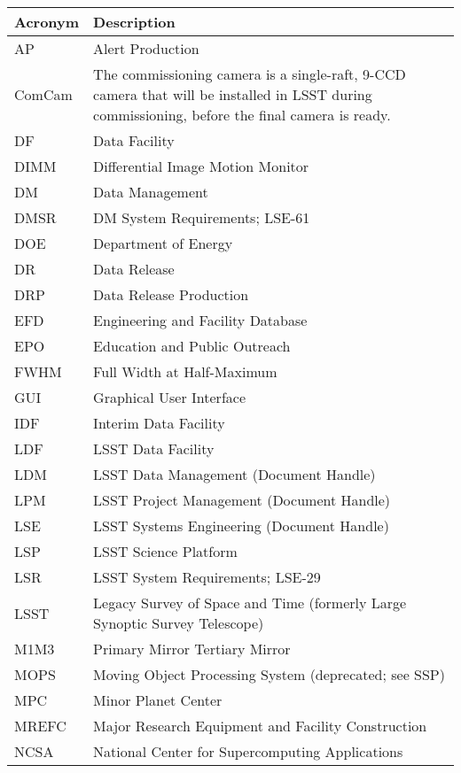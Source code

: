 \addtocounter{table}{-1}
\begin{longtable}{p{}p{}}\hline
\textbf{Acronym} & \textbf{Description}  \\\hline

AP & Alert Production \\\hline
ComCam & The commissioning camera is a single-raft, 9-CCD camera that will be installed in LSST during commissioning, before the final camera is ready. \\\hline
DF & Data Facility \\\hline
DIMM & Differential Image Motion Monitor \\\hline
DM & Data Management \\\hline
DMSR & DM System Requirements; LSE-61 \\\hline
DOE & Department of Energy \\\hline
DR & Data Release \\\hline
DRP & Data Release Production \\\hline
EFD & Engineering and Facility Database \\\hline
EPO & Education and Public Outreach \\\hline
FWHM & Full Width at Half-Maximum \\\hline
GUI & Graphical User Interface \\\hline
IDF & Interim Data Facility \\\hline
LDF & LSST Data Facility \\\hline
LDM & LSST Data Management (Document Handle) \\\hline
LPM & LSST Project Management (Document Handle) \\\hline
LSE & LSST Systems Engineering (Document Handle) \\\hline
LSP & LSST Science Platform \\\hline
LSR & LSST System Requirements; LSE-29 \\\hline
LSST & Legacy Survey of Space and Time (formerly Large Synoptic Survey Telescope) \\\hline
M1M3 & Primary Mirror Tertiary Mirror \\\hline
MOPS & Moving Object Processing System (deprecated; see SSP) \\\hline
MPC & Minor Planet Center \\\hline
MREFC & Major Research Equipment and Facility Construction \\\hline
NCSA & National Center for Supercomputing Applications \\\hline

\end{longtable}
